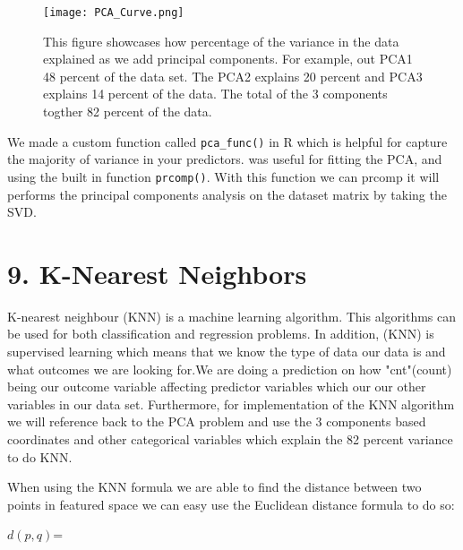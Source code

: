 \documentclass[
]{article}
\begin{document}
\begin{figure}
\centering
\texttt{[image: PCA\_Curve.png]}
\caption{This figure showcases how percentage of the variance in the data explained as we add principal components. For example, out PCA1 48 percent of the data set. The PCA2 explains 20 percent and PCA3 explains 14 percent of the data. The total of the 3 components togther 82 percent of the data.}
\end{figure}

We made a custom function called \texttt{pca\_func()} in R which is helpful for capture the majority of variance in your predictors.\color{black} was useful for fitting the PCA, and using the built in function \texttt{prcomp()}. With this function we can prcomp it will performs the principal components analysis on the dataset matrix by taking the SVD.


\hypertarget{k-Nearest Neighbors}{%
\section{9. K-Nearest Neighbors }\label{k-Nearest Neighbors}}
K-nearest neighbour (KNN) is a machine learning algorithm. This algorithms can be used for both classification and regression problems. In addition, (KNN) is supervised learning which means that we know the type of data our data is and what outcomes we are looking for.We are doing a prediction on how "cnt"(count) being our outcome variable affecting predictor variables which our our other variables in our data set. Furthermore, for implementation of the KNN algorithm we will reference back to the PCA problem and use the 3 components based coordinates and other categorical variables which explain the 82 percent variance to do KNN. 

When using the KNN formula we are able to find the distance between two points in featured space we can easy use the Euclidean distance formula to do so:

$d(p,q)$= 

\newpage
\end{document}

